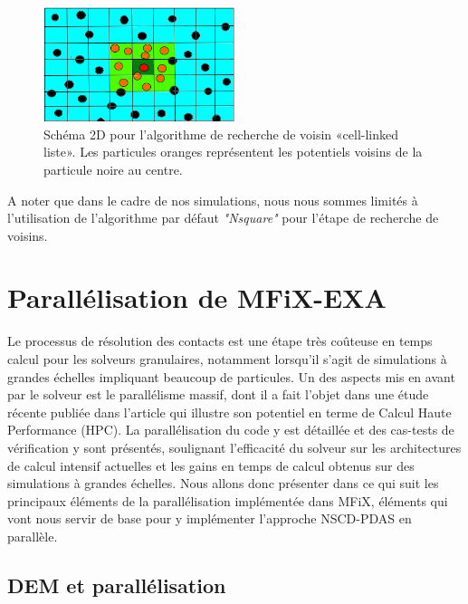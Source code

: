 \begin{figure}[!h]
        \centering
        \includegraphics[width=0.5\textwidth]{chapitres/chapitre_4/figures/schematic_cell-linked_list.png}
        \caption{Schéma 2D pour l'algorithme de recherche de voisin «cell-linked liste». Les particules oranges représentent les potentiels voisins de la particule noire au centre.}
        \label{fig5}    
    \end{figure}
    
A noter que dans le cadre de nos simulations, nous nous sommes limités à l'utilisation de l'algorithme par défaut \textit{"Nsquare"} pour l'étape de recherche de voisins.

\section{Parallélisation de MFiX-EXA}

Le processus de résolution des contacts est une étape très coûteuse en temps calcul pour les solveurs granulaires, notamment lorsqu'il s'agit de simulations à grandes échelles impliquant beaucoup de particules. Un des aspects mis en avant par le solveur est le parallélisme massif, dont il a fait l'objet dans une étude récente publiée dans l'article \cite{gopalakrishnan2013development} qui illustre son potentiel en terme de Calcul Haute Performance (HPC). La parallélisation du code y est détaillée et des cas-tests de vérification y sont présentés, soulignant l'efficacité du solveur sur les architectures de calcul intensif actuelles et les gains en temps de calcul obtenus sur des simulations à grandes échelles. Nous allons donc présenter dans ce qui suit les principaux éléments de la parallélisation implémentée dans MFiX, éléments qui vont nous servir de base pour y implémenter l'approche NSCD-PDAS en parallèle.

\subsection{DEM et parallélisation}\label{parallelisation_dem}

